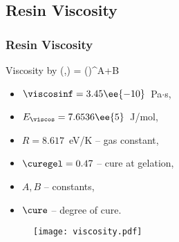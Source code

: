 \documentclass[compress]{beamer}%
\newenvironment{myalign}
{\align\color{\notcolor}}
{
  \nonumber
  \endalign
  \vspace{-1em}
}
\begin{document}
\subsection{Resin Viscosity}

\begin{frame}
  \frametitle{Resin Viscosity}
      Viscosity by \citet{Kenny1992}
      \begin{myalign}
        \viscos(\temp,\cure) =
        \viscosinf {} \left(\frac{\curegel}{\curegel - \cure}\right)^{A+B\cure} 
      \end{myalign}
      {\begin{multicols}{2}
      \begin{itemize}
        \item $\viscosinf=3.45\ee{-10}$~Pa$\cdot$s, %
        \item $E_\viscos = 7.6536\ee{5}$~J/mol, %
        \item $R = 8.617$~eV/K --  gas constant,
        \item $\curegel = 0.47$ -- cure at  gelation,
        \item $A, B$ -- constants,
      \item $\cure$ -- degree of cure.
      \end{itemize}
    \end{multicols}}

      \begin{figure}
  \centering
  \texttt{[image: viscosity.pdf]}
  \label{fig:viscos}
\end{figure}
  
\end{frame}
\end{document}
